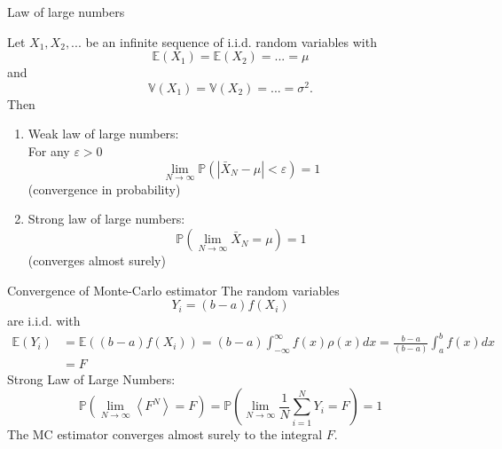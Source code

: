 \documentclass{beamer}
\begin{document}
\begin{frame}{Law of large numbers}

Let $X_1,X_2,...$ be an infinite sequence of i.i.d. random variables with 
$$
\mathbb{E}(X_1) = \mathbb{E}(X_2) = ... = \mu
$$
and 
$$
\mathbb{V}(X_1) = \mathbb{V}(X_2) =...= \sigma^2.
$$
Then
\begin{enumerate}
    \item Weak law of large numbers:\\
    For any $\varepsilon >0$
    $$
    \lim_{N \to \infty} \mathbb{P}\left(
    | \bar{X}_N - \mu|< \varepsilon\right)
    = 1
    $$
    (convergence in probability)
    \item Strong law of large numbers:\\
    $$
    \mathbb{P} \left( 
    \lim_{N \to \infty} \bar{X}_N = \mu
    \right) = 1
    $$
    (converges almost surely)
\end{enumerate}

\end{frame}

\begin{frame}{Convergence of Monte-Carlo estimator}
The random variables 
$$
Y_i = (b-a)f(X_i)
$$
are i.i.d. with 
\begin{align*}
\mathbb{E}(Y_i)
&=
\mathbb{E}((b-a)f(X_i))
=
(b-a)\int_{-\infty}^\infty
f(x)\rho(x)dx
=
\frac{b-a}{(b-a)}
\int_a^b
f(x)dx\\
&=
F
\end{align*}
Strong Law of Large Numbers:
$$
\mathbb{P}\left(
\lim_{N\to \infty} 
\left\langle
F^N
\right\rangle = F
\right) 
=
\mathbb{P}\left(
\lim_{N\to \infty} \frac{1}{N}\sum_{i=1}^N Y_i
= F
\right) 
= 1
$$
The MC estimator converges almost surely to the integral $F$.
\end{frame}
\end{document}
